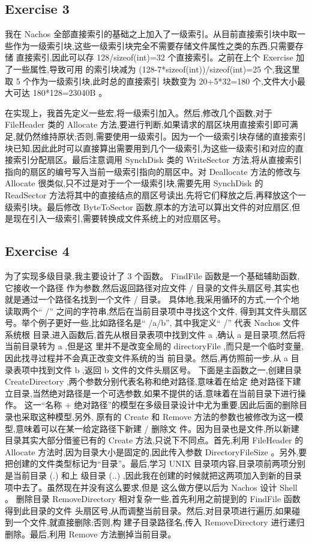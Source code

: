 \documentclass[nofonts]{ctexart}
\begin{document}
\subsection*{Exercise 3}

我在 Nachos 全部直接索引的基础之上加入了一级索引。从目前直接索引块中取一些作为一级索引块,这些一级索引块完全不需要存储文件属性之类的东西,只需要存储
直接索引,因此可以存 128/sizeof(int)=32 个直接索引。之前在上个 Exercise 加了一些属性,导致可用
的索引块减为 (128-7*sizeof(int))/sizeof(int)=25 个,我这里取 5 个作为一级索引块,此时总的直接索引
块数变为 20+5*32=180 个,文件大小最大可达 180*128=23040B 。

在实现上，我首先定义一些宏,将一级索引加入。然后,修改几个函数,对于 FileHeader 类的 Allocate
方法,要进行判断,如果请求的扇区块用直接索引即可满足,就仍然维持原状;否则,需要使用一级索引。因为一个一级索引块存储的直接索引块已知,因此此时可以直接算出需要用到几个一级索引,为这些一级索引和对应的直接索引分配扇区。最后注意调用 SynchDisk 类的 WriteSector 方法,将从直接索引指向的扇区的编号写入当前一级索引指向的扇区中。对 Deallocate 方法的修改与 Allocate 很类似,只不过是对于一个一级索引块,需要先用 SynchDisk 的 ReadSector 方法将其中的直接结点的扇区号读出,先将它们释放之后,再释放这个一级索引块。最后修改 ByteToSector 函数,原本的方法可以算出文件的对应扇区,但是现在引入一级索引,需要转换成文件系统上的对应扇区号。


\subsection*{Exercise 4}
为了实现多级目录,我主要设计了 3 个函数。 FindFile 函数是一个基础辅助函数,它接收一个路径
作为参数,然后返回路径对应文件 / 目录的文件头扇区号,其实也就是通过一个路径名找到一个文件 / 目录。
具体地,我采用循环的方式,一个个地读取两个“ /” 之间的字符串,然后在当前目录项中寻找这个文件,
得到其文件头扇区号。举个例子更好一些,比如路径名是“ /a/b”, 其中我定义“ /” 代表 Nachos 文件系统根
目录,进入函数后,首先从根目录表项中找到文件 a ,确认 a 是目录项,然后将当前目录转为 a ,但是这
里并不是改变全局的 directoryFile ,而只是一个临时变量,因此找寻过程并不会真正改变文件系统的当
前目录。然后,再仿照前一步,从 a 目录表项中找到文件 b ,返回 b 文件的文件头扇区号。
下面是主函数之一,创建目录 CreateDirectory ,两个参数分别代表名称和绝对路径,意味着在给定
绝对路径下建立目录,当然绝对路径是一个可选参数,如果不提供的话,意味着在当前目录下进行操作。
这一“名称 + 绝对路径”的模型在多级目录设计中尤为重要,因此后面的删除目录也采取这种模型,另外,
原有的 Create 和 Remove 方法的参数也被修改为这一模型,意味着可以在某一给定路径下新建 / 删除文
件。因为目录也是文件,所以新建目录其实大部分借鉴已有的 Create 方法,只说下不同点。首先,利用
FileHeader 的 Allocate 方法时,因为目录大小是固定的,因此传入参数 DirectoryFileSize 。另外,要
把创建的文件类型标记为“目录”。最后,学习 UNIX 目录项内容,目录项前两项分别是当前目录 (.) 和上
级目录 (..) ,因此我在创建的时候就把这两项加入到新的目录项中去了。虽然现在并没有这么要求,但是
这么做方便以后为 Nachos 设计 Shell 。
删除目录 RemoveDirectory 相对复杂一些,首先利用之前提到的 FindFile 函数得到此目录的文件
头扇区号,从而调整当前目录。然后,对目录项进行遍历,如果碰到一个文件,就直接删除;否则,构
建子目录路径名,传入 RemoveDirectory 进行递归删除。最后,利用 Remove 方法删掉当前目录。
\end{document}
